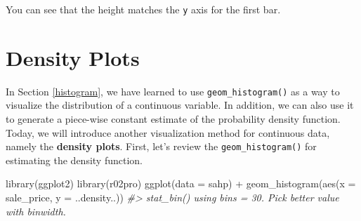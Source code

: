 \documentclass[
]{book}
\newenvironment{Shaded}{\begin{snugshade}}{\end{snugshade}}
\newcommand{\AttributeTok}[1]{\textcolor[rgb]{0.77,0.63,0.00}{#1}}
\newcommand{\CommentTok}[1]{\textcolor[rgb]{0.56,0.35,0.01}{\textit{#1}}}
\newcommand{\FloatTok}[1]{\textcolor[rgb]{0.00,0.00,0.81}{#1}}
\newcommand{\FunctionTok}[1]{\textcolor[rgb]{0.00,0.00,0.00}{#1}}
\newcommand{\NormalTok}[1]{#1}
\newcommand{\OtherTok}[1]{\textcolor[rgb]{0.56,0.35,0.01}{#1}}
\newcommand{\SpecialCharTok}[1]{\textcolor[rgb]{0.00,0.00,0.00}{#1}}
\begin{document}
\begin{Shaded}
\end{Shaded}

You can see that the height matches the \texttt{y} axis for the first bar.

\hypertarget{density-plot}{%
\section{Density Plots}\label{density-plot}}

In Section \ref{histogram}, we have learned to use \texttt{geom\_histogram()} as a way to visualize the distribution of a continuous variable. In addition, we can also use it to generate a piece-wise constant estimate of the probability density function. Today, we will introduce another visualization method for continuous data, namely the \textbf{density plots}. First, let's review the \texttt{geom\_histogram()} for estimating the density function.

\begin{Shaded}
\begin{Highlighting}[]
\FunctionTok{library}\NormalTok{(ggplot2)}
\FunctionTok{library}\NormalTok{(r02pro)}
\FunctionTok{ggplot}\NormalTok{(}\AttributeTok{data =}\NormalTok{ sahp) }\SpecialCharTok{+}  \FunctionTok{geom\_histogram}\NormalTok{(}\FunctionTok{aes}\NormalTok{(}\AttributeTok{x =}\NormalTok{ sale\_price, }\AttributeTok{y =}\NormalTok{ ..density..))}
\CommentTok{\#\textgreater{} \textasciigrave{}stat\_bin()\textasciigrave{} using \textasciigrave{}bins = 30\textasciigrave{}. Pick better value with \textasciigrave{}binwidth\textasciigrave{}.}
\end{Highlighting}
\end{Shaded}
\end{document}
